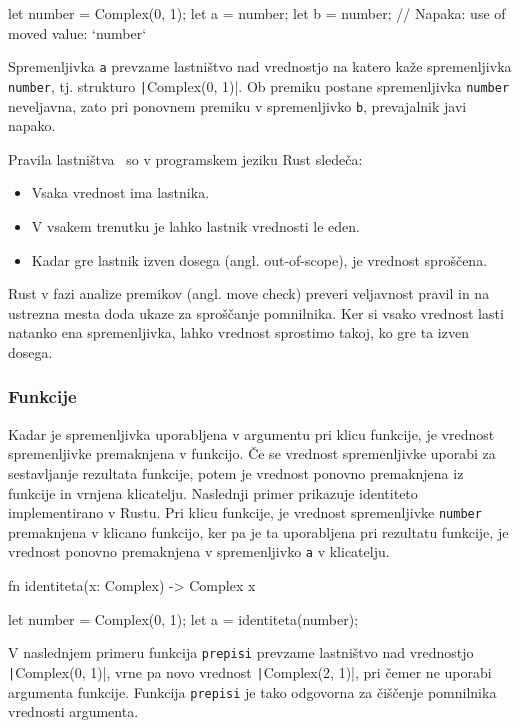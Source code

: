 \begin{rust-failure}
let number = Complex(0, 1);
let a = number;
let b = number;  // Napaka: use of moved value: `number`
\end{rust-failure}

Spremenljivka \texttt{a} prevzame lastništvo nad vrednostjo na katero kaže spremenljivka \texttt{number}, tj. strukturo \texttt|Complex(0, 1)|. Ob premiku postane spremenljivka \texttt{number} neveljavna, zato pri ponovnem premiku v spremenljivko \texttt{b}, prevajalnik javi napako.

Pravila lastništva~\cite{klabnik2023rust} so v programskem jeziku Rust sledeča:

\begin{itemize}
	\itemsep 0em
	\item Vsaka vrednost ima lastnika.
	\item V vsakem trenutku je lahko lastnik vrednosti le eden.
	\item Kadar gre lastnik izven dosega (angl. out-of-scope), je vrednost spro\-šče\-na.
\end{itemize}

Rust v fazi analize premikov (angl. move check) preveri veljavnost pravil in na ustrezna mesta doda ukaze za sproščanje pomnilnika. Ker si vsako vrednost lasti natanko ena spremenljivka, lahko vrednost sprostimo takoj, ko gre ta izven dosega.

\subsubsection{Funkcije}

Kadar je spremenljivka uporabljena v argumentu pri klicu funkcije, je vrednost spremenljivke premaknjena v funkcijo. Če se vrednost spremenljivke uporabi za sestavljanje rezultata funkcije, potem je vrednost ponovno premaknjena iz funkcije in vrnjena klicatelju. Naslednji primer prikazuje identiteto implementirano v Rustu. Pri klicu funkcije, je vrednost spremenljivke \texttt{number} premaknjena v klicano funkcijo, ker pa je ta uporabljena pri rezultatu funkcije, je vrednost ponovno premaknjena v spremenljivko \texttt{a} v klicatelju.

\begin{rust-success}
fn identiteta(x: Complex) -> Complex { x }

let number = Complex(0, 1);
let a = identiteta(number);
\end{rust-success}

V naslednjem primeru funkcija \texttt{prepisi} prevzame lastništvo nad vrednostjo \texttt|Complex(0, 1)|, vrne pa novo vrednost \texttt|Complex(2, 1)|, pri čemer ne uporabi argumenta funkcije. Funkcija \texttt{prepisi} je tako odgovorna za čiščenje pomnilnika vrednosti argumenta.

